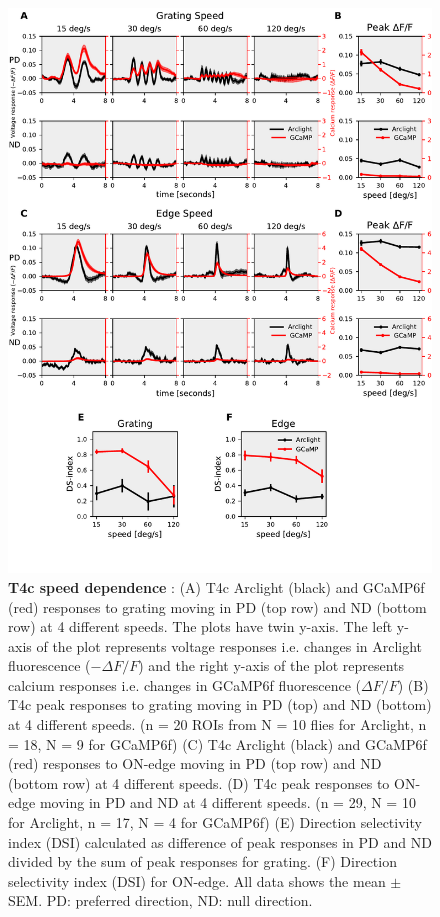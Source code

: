 \documentclass[9pt,lineno]{elife}
\begin{document}
\begin{figure}
\begin{fullwidth}
\includegraphics[width=0.84\linewidth]{figure1}
\caption{\textbf{T4c speed dependence} : (A) T4c Arclight (black) and GCaMP6f (red) responses to grating moving in PD (top row) and ND (bottom row) at 4 different speeds. The plots have twin y-axis. The left y-axis of the plot represents voltage responses i.e. changes in Arclight fluorescence ($-\Delta F/F$) and the right y-axis of the plot represents calcium responses i.e. changes in GCaMP6f fluorescence ($\Delta F/F$) (B) T4c peak responses to grating moving in PD (top) and ND (bottom) at 4 different speeds. (n = 20 ROIs from N = 10 flies for Arclight, n = 18, N = 9 for GCaMP6f) (C) T4c Arclight (black) and GCaMP6f (red) responses to ON-edge moving in PD (top row) and ND (bottom row) at 4 different speeds. (D) T4c peak responses to ON-edge moving in PD and ND at 4 different speeds. (n = 29, N = 10 for Arclight, n = 17, N = 4 for GCaMP6f) (E) Direction selectivity index (DSI) calculated as difference of peak responses in PD and ND divided by the sum of peak responses for grating. (F) Direction selectivity index (DSI) for ON-edge. All data shows the mean $\pm$ SEM. PD: preferred direction, ND: null direction.}

\label{PDNDspeed}
	
\end{fullwidth}
\end{figure} 
\end{document}
